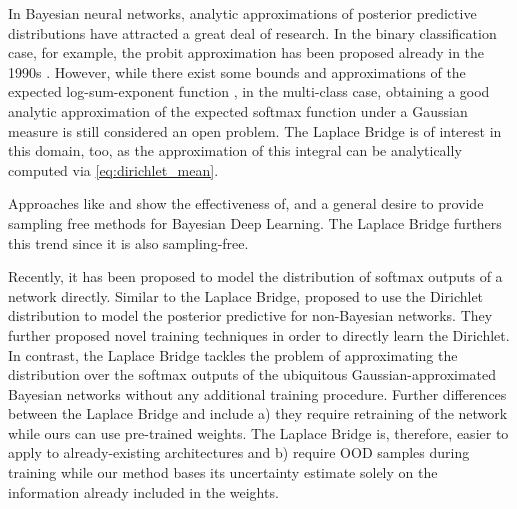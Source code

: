 

In Bayesian neural networks, analytic approximations of posterior predictive distributions have attracted a great deal of research. In the binary classification case, for example, the probit approximation has been proposed already in the 1990s \citep{spiegelhalter1990sequential,mackay1992evidence}. However, while there exist some bounds \citep{michalis2016one} and approximations of the expected log-sum-exponent function \citep{ahmed2007tight,braun2010variational}, in the multi-class case, obtaining a good analytic approximation of the expected softmax function under a Gaussian measure is still considered an open problem. The Laplace Bridge is of interest in this domain, too, as the approximation of this integral can be analytically computed via \eqref{eq:dirichlet_mean}.

Approaches like \cite{DeterministicVI2018} and \cite{haussmann2019BEDLwithPAC} show the effectiveness of, and a general desire to provide sampling free methods for Bayesian Deep Learning. The Laplace Bridge furthers this trend since it is also sampling-free.

Recently, it has been proposed to model the distribution of softmax outputs of a network directly. Similar to the Laplace Bridge, \citet{NIPS2018PriorNetworks,NIPS2019PriorNetworks_improved,NIPS2018EvidentialDL} proposed to use the Dirichlet distribution to model the posterior predictive for non-Bayesian networks. They further proposed novel training techniques in order to directly learn the Dirichlet. In contrast, the Laplace Bridge tackles the problem of approximating the distribution over the softmax outputs of the ubiquitous Gaussian-approximated Bayesian networks \citep[etc]{Graves2011VB,Blundell2015WeightUI,louizos_structured_2016,sun_learning_2017} without any additional training procedure. Further differences between the Laplace Bridge and  \cite{NIPS2018PriorNetworks,NIPS2019PriorNetworks_improved,NIPS2018EvidentialDL} include a) they require retraining of the network while ours can use pre-trained weights. The Laplace Bridge is, therefore, easier to apply to already-existing architectures and b) \cite{NIPS2018PriorNetworks,NIPS2019PriorNetworks_improved} require OOD samples during training while our method bases its uncertainty estimate solely on the information already included in the weights.


